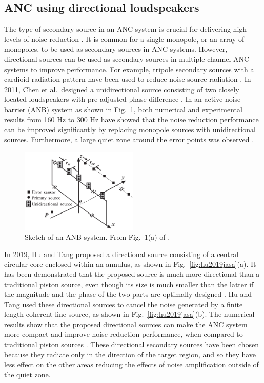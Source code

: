 \subsection{ANC using directional loudspeakers}
\label{eq:review_anc_directional}
The type of secondary source in an ANC system is crucial for {delivering high levels of} noise reduction \cite{Bolton1995SoundCancellationUse, Qiu2000SecondaryAcousticSource}.
{It is common for a single monopole, or an array of monopoles, to be used as secondary sources in ANC systems}.
However, directional sources can be used as secondary sources in multiple channel ANC systems to improve performance. 
For example, tripole secondary sources with a cardioid radiation pattern have been used to reduce noise source radiation \cite{Mangiante1977ActiveSoundAbsorption}.
In 2011, Chen et al.\ designed a unidirectional source consisting of two closely located loudspeakers with pre-adjusted phase difference \cite{Chen2011ActiveNoiseBarrier}.
In an active noise barrier (ANB) system as shown in Fig.~\ref{fig:chen2011anb_sketch}, both numerical and experimental results from 160 Hz to 300 Hz have showed that the noise reduction performance can be improved {significantly} by replacing monopole sources with unidirectional sources.
Furthermore, a large quiet zone around the error points was observed \cite{Chen2011ActiveNoiseBarrier}.

\begin{figure}[!htb]
    \centering
    \includegraphics[width = 0.5\textwidth]{fig/chen2011anb_resize.png}
    \caption{Sketch of an ANB system. From Fig.~1(a) of \cite{Chen2011ActiveNoiseBarrier}.}
    \label{fig:chen2011anb_sketch}
\end{figure}

In 2019, Hu and Tang proposed a directional source consisting of a central circular core enclosed within an annulus, as shown in Fig.~\ref{fig:hu2019jasa}(a). 
It has been demonstrated that the proposed source is much more directional {than} a traditional piston source, even {though} its size is much smaller than the latter if the magnitude and the phase of the two parts are optimally designed \cite{Hu2019ActiveCancellationSound}. 
{Hu and Tang used these} directional sources to cancel the noise generated by a finite length coherent line source, as shown in Fig.~\ref{fig:hu2019jasa}(b). 
The numerical results show that the proposed directional sources can make the ANC system more compact and improve noise reduction performance, when compared to traditional piston sources \cite{Hu2019ActiveCancellationSound}.
These directional secondary sources have been chosen because they radiate only in the direction of the target region, and so they have less effect on the other areas reducing the effects of noise amplification outside of the quiet zone.


